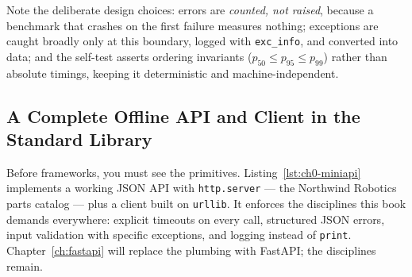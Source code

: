 Note the deliberate design choices: errors are \emph{counted, not raised},
because a benchmark that crashes on the first failure measures nothing;
exceptions are caught broadly only at this boundary, logged with
\texttt{exc\_info}, and converted into data; and the self-test asserts
ordering invariants ($p_{50} \le p_{95} \le p_{99}$) rather than absolute
timings, keeping it deterministic and machine-independent.

\subsection{A Complete Offline API and Client in the Standard Library}
\label{sec:ch0-miniapi}

Before frameworks, you must see the primitives. Listing~\ref{lst:ch0-miniapi}
implements a working JSON API with \texttt{http.server} --- the Northwind
Robotics parts catalog --- plus a client built on \texttt{urllib}. It
enforces the disciplines this book demands everywhere: explicit timeouts on
every call, structured JSON errors, input validation with specific
exceptions, and logging instead of \texttt{print}. Chapter~\ref{ch:fastapi}
will replace the plumbing with FastAPI; the disciplines remain.

